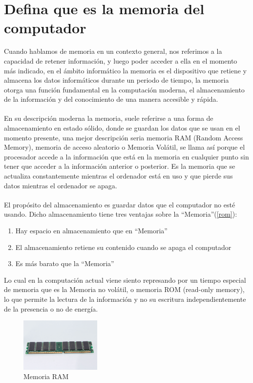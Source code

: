 \documentclass{article}
\begin{document}
	\section{Defina que es la memoria del computador} \label{defina}
	Cuando hablamos de memoria en un contexto general, nos referimos a la capacidad de retener información, y luego poder acceder a ella en el momento más indicado, en el ámbito informático la memoria es el dispositivo que retiene y almacena los datos informáticos durante un periodo de tiempo, la memoria otorga una función fundamental en la computación moderna, el almacenamiento de la información y del conocimiento de una manera accesible y rápida.\cite{memoria}
	\\\\
	En su descripción moderna la memoria, suele referirse a una forma de almacenamiento en estado sólido, donde se guardan los datos que se usan en el momento presente, una mejor descripción seria memoria RAM (Random Access Memory), memoria de acceso aleatorio o Memoria Volátil\cite{monografia}, se llama así porque el procesador accede a la información que está en la memoria en cualquier punto sin tener que acceder a la información anterior o posterior. Es la memoria que se actualiza constantemente mientras el ordenador está en uso y que pierde sus datos mientras el ordenador se apaga.
	\\\\
	El propósito del almacenamiento es guardar datos que el computador no esté usando. Dicho almacenamiento tiene tres ventajas sobre la “Memoria”(\ref{rom}):
	
	\begin{enumerate}
		
		\item Hay espacio en almacenamiento que en “Memoria”
		\item El almacenamiento retiene su contenido cuando se apaga el computador
		\item Es más barato que la “Memoria”
		
	\end{enumerate}

	 Lo cual en la computación actual viene siento represando por un tiempo especial de memoria que es la Memoria no volátil, o memoria ROM (read-only memory), lo que permite la lectura de la información y no su escritura independientemente de la presencia o no de energía.
	 \begin{figure}[h]
	 	\includegraphics[width=4cm]{ram.jpg}
	 	\centering
	 	\caption{Memoria RAM}
	 	\label{ram}
	 \end{figure}
 
\end{document}
